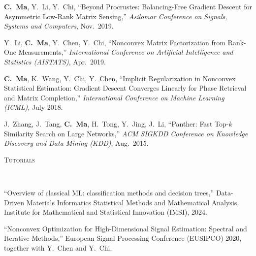 \documentclass[a4paper, 10pt]{article}
\newenvironment{changemargin}[2]{%
  \begin{list}{}{%
    \setlength{\topsep}{0pt}%
    \setlength{\leftmargin}{#1}%
    \setlength{\rightmargin}{#2}%
    \setlength{\listparindent}{\parindent}%
    \setlength{\itemindent}{\parindent}%
    \setlength{\parsep}{\parskip}%
  }%
  \item[]}{\end{list}
}
\newcommand{\lineover}{
	\begin{changemargin}{-0.05in}{-0.05in}
		\vspace*{-8pt}
		\hrulefill \\
		\vspace*{-2pt}
	\end{changemargin}
}
\newcommand{\header}[1]{
	\begin{changemargin}{-0.5in}{-0.5in}
		\scshape{#1}\\
  	\lineover
	\end{changemargin}
}
\newenvironment{body} {
	\vspace*{-16pt}
	\begin{changemargin}{-0.3in}{-0.5in}
  }	
	{\end{changemargin}
}
\begin{document}
\begin{body}
\begin{enumerate}[label={[{C}{{\arabic*}}]}]
	\item \textbf{C.~Ma}, Y.~Li, Y.~Chi, {``Beyond Procrustes: Balancing-Free Gradient Descent for Asymmetric Low-Rank Matrix Sensing,''} \emph{Asilomar Conference on Signals, Systems and Computers}, Nov.~2019. \\
	\item 
	Y.~Li, \textbf{C.~Ma}, Y.~Chen, Y.~Chi, {{``Nonconvex Matrix Factorization from Rank-One Measurements,''}} \emph{International Conference on Artificial Intelligence and Statistics (AISTATS)}, Apr.~2019. \\
	
	\item 
	\textbf{C.~Ma}, K.~Wang, Y.~Chi, Y.~Chen, {{``Implicit Regularization in Nonconvex Statistical Estimation: Gradient Descent Converges Linearly for Phase Retrieval and Matrix Completion,''}} \emph{International Conference on Machine Learning (ICML)}, July 2018. \\
	
	\item J.~Zhang, J.~Tang, \textbf{C.~Ma}, H.~Tong, Y.~Jing, J.~Li, {{``Panther: Fast Top-$k$ Similarity Search on Large Networks,''}} \emph{ACM SIGKDD Conference on Knowledge Discovery and Data Mining (KDD)}, Aug.~2015.\\
	
	
	\end{enumerate}
\end{body}

\newpage

\bigskip
\header{\LARGE{Tutorials}}
\begin{body}

\vspace{18pt}
\begin{enumerate}[label={[{Tut}{{\arabic*}}]}]
\item ``Overview of classical ML: classification methods and decision trees,'' Data-Driven Materials Informatics
Statistical Methods and Mathematical Analysis, Institute for Mathematical and Statistical Innovation (IMSI), 2024.  
\item  {``Nonconvex Optimization for High-Dimensional Signal Estimation: Spectral and Iterative Methods,''} European Signal Processing Conference (EUSIPCO) 2020, together with Y.~Chen and Y.~Chi.
\end{enumerate}

\end{body}
\end{document}
